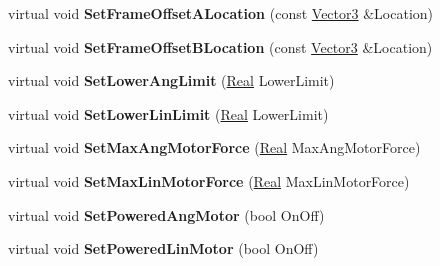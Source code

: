 \begin{DoxyCompactItemize}
\item 
\hypertarget{classphys_1_1SliderConstraint_a8968c8a93630a4e712a48efde04e74f6}{
virtual void {\bfseries SetFrameOffsetALocation} (const \hyperlink{classphys_1_1Vector3}{Vector3} \&Location)}
\label{classphys_1_1SliderConstraint_a8968c8a93630a4e712a48efde04e74f6}

\item 
\hypertarget{classphys_1_1SliderConstraint_ac3ebd4a2e8af9a50e1a910050e8ed9f9}{
virtual void {\bfseries SetFrameOffsetBLocation} (const \hyperlink{classphys_1_1Vector3}{Vector3} \&Location)}
\label{classphys_1_1SliderConstraint_ac3ebd4a2e8af9a50e1a910050e8ed9f9}

\item 
\hypertarget{classphys_1_1SliderConstraint_a81933eb795ec4fb7d5172e68a023071b}{
virtual void {\bfseries SetLowerAngLimit} (\hyperlink{namespacephys_af7eb897198d265b8e868f45240230d5f}{Real} LowerLimit)}
\label{classphys_1_1SliderConstraint_a81933eb795ec4fb7d5172e68a023071b}

\item 
\hypertarget{classphys_1_1SliderConstraint_a159e545dcae060c36be16ff00748f259}{
virtual void {\bfseries SetLowerLinLimit} (\hyperlink{namespacephys_af7eb897198d265b8e868f45240230d5f}{Real} LowerLimit)}
\label{classphys_1_1SliderConstraint_a159e545dcae060c36be16ff00748f259}

\item 
\hypertarget{classphys_1_1SliderConstraint_acd6db1bc63c9c2e5b1572ffed38405cf}{
virtual void {\bfseries SetMaxAngMotorForce} (\hyperlink{namespacephys_af7eb897198d265b8e868f45240230d5f}{Real} MaxAngMotorForce)}
\label{classphys_1_1SliderConstraint_acd6db1bc63c9c2e5b1572ffed38405cf}

\item 
\hypertarget{classphys_1_1SliderConstraint_ab2f02e7627457661e75c6a6ace1b1b92}{
virtual void {\bfseries SetMaxLinMotorForce} (\hyperlink{namespacephys_af7eb897198d265b8e868f45240230d5f}{Real} MaxLinMotorForce)}
\label{classphys_1_1SliderConstraint_ab2f02e7627457661e75c6a6ace1b1b92}

\item 
\hypertarget{classphys_1_1SliderConstraint_a7bc47cdcaa399ae12e8282b4d8fa0361}{
virtual void {\bfseries SetPoweredAngMotor} (bool OnOff)}
\label{classphys_1_1SliderConstraint_a7bc47cdcaa399ae12e8282b4d8fa0361}

\item 
\hypertarget{classphys_1_1SliderConstraint_aa7c6ac747fda97d1d0b9d708b557c104}{
virtual void {\bfseries SetPoweredLinMotor} (bool OnOff)}
\label{classphys_1_1SliderConstraint_aa7c6ac747fda97d1d0b9d708b557c104}


\end{DoxyCompactItemize}

